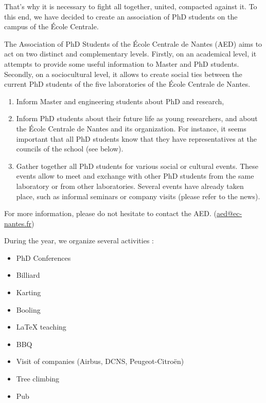 \documentclass[12pt, english, squeezeCommittee, fancyChapter, fancyPart]{these-LUNAM}
\begin{document}
That's why it is necessary to fight all together, united, compacted against it.
To this end, we have decided to create an association of PhD students on the campus of the École Centrale.


The Association of PhD Students of the École Centrale de Nantes (AED) aims to act on two distinct and complementary levels. Firstly, on an academical level, it attempts to provide some useful information to Master and PhD students. Secondly, on a sociocultural level, it allows to create social ties between the current PhD students of the five laboratories of the École Centrale de Nantes.

\begin{enumerate}
    \item Inform Master and engineering students about PhD and research,
    \item Inform PhD students about their future life as young researchers, and about the École Centrale de Nantes and its organization. For instance, it seems important that all PhD students know that they have representatives at the councils of the school (see below).
    \item Gather together all PhD students for various social or cultural events. These events allow to meet and exchange with other PhD students from the same laboratory or from other laboratories. Several events have already taken place, such as informal seminars or company visits (please refer to the news).
\end{enumerate}

For more information, please do not hesitate to contact the AED. (\url{aed@ec-nantes.fr})


During the year, we organize several activities :
\begin{itemize}
    \item PhD Conferences
    \item Billiard
    \item Karting
    \item Booling
    \item \LaTeX{} teaching
    \item BBQ
    \item Visit of companies (Airbus, DCNS, Peugeot-Citroën)
    \item Tree climbing
    \item Pub
\end{itemize}
\mainmatter



%


\end{document}
